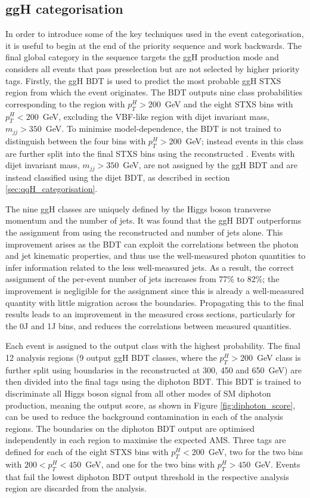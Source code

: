 \subsection{ggH categorisation}
In order to introduce some of the key techniques used in the event categorisation, it is useful to begin at the end of the priority sequence and work backwards. The final global category in the sequence targets the ggH production mode and considers all events that pass preselection but are not selected by higher priority tags. Firstly, the ggH BDT is used to predict the most probable ggH STXS region from which the event originates. The BDT outputs nine class probabilities corresponding to the region with $p_T^H>200$~GeV and the eight STXS bins with $p_T^H<200$~GeV, excluding the VBF-like region with dijet invariant mass, $m_{jj}>350$~GeV. To minimise model-dependence, the BDT is not trained to distinguish between the four bins with $p_T^H>200$~GeV; instead events in this class are further split into the final STXS bins using the reconstructed \ptgg. Events with dijet invariant mass, $m_{jj}>350$~GeV, are not assigned by the ggH BDT and are instead classified using the dijet BDT, as described in section \ref{sec:qqH_categorisation}.

The nine ggH classes are uniquely defined by the Higgs boson transverse momentum and the number of jets. It was found that the ggH BDT outperforms the assignment from using the reconstructed \ptgg and number of jets alone. This improvement arises as the BDT can exploit the correlations between the photon and jet kinematic properties, and thus use the well-measured photon quantities to infer information related to the less well-measured jets. As a result, the correct assignment of the per-event number of jets increases from 77\% to 82\%; the improvement is negligible for the \ptgg assignment since this is already a well-measured quantity with little migration across the \ptH boundaries. Propagating this to the final results leads to an improvement in the measured cross sections, particularly for the 0J and 1J bins, and reduces the correlations between measured quantities.

Each event is assigned to the output class with the highest probability. The final 12 analysis regions (9 output ggH BDT classes, where the $p_T^H>200$~GeV class is further split using boundaries in the reconstructed \ptgg at 300, 450 and 650~GeV) are then divided into the final tags using the diphoton BDT. This BDT is trained to discriminate all Higgs boson signal from all other modes of SM diphoton production, meaning the output score, as shown in Figure \ref{fig:diphoton_score}, can be used to reduce the background contamination in each of the analysis regions. The boundaries on the diphoton BDT output are optimised independently in each region to maximise the expected AMS. Three tags are defined for each of the eight STXS bins with $p_T^H<200$~GeV, two for the two bins with $200<p_T^H<450$~GeV, and one for the two bins with $p_T^H>450$~GeV. Events that fail the lowest diphoton BDT output threshold in the respective analysis region are discarded from the analysis. 

